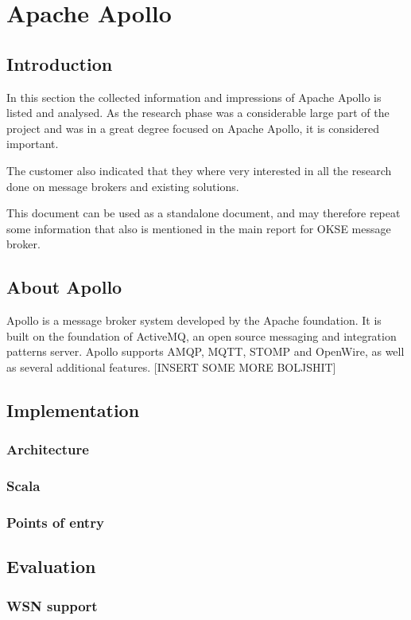 \chapter{Apache Apollo}
\label{appendix:apache-apollo}

\section{Introduction}
In this section the collected information and impressions of Apache Apollo is listed and analysed. As the research phase was a considerable large part of the project and was in a great degree focused on Apache Apollo, it is considered important.

The customer also indicated that they where very interested in all the research done on message brokers and existing solutions.

This document can be used as a standalone document, and may therefore repeat some information that also is mentioned in the main report for OKSE message broker.

\section{About Apollo}
Apollo is a message broker system developed by the Apache foundation. It is built on the foundation of ActiveMQ, an open source messaging and integration patterns server. Apollo supports AMQP, MQTT, STOMP and OpenWire, as well as several additional features. [INSERT SOME MORE BOLJSHIT]

\section{Implementation}

\subsection{Architecture}

\subsection{Scala}

\subsection{Points of entry}


\section{Evaluation}

\subsection{WSN support}

\clearpage
